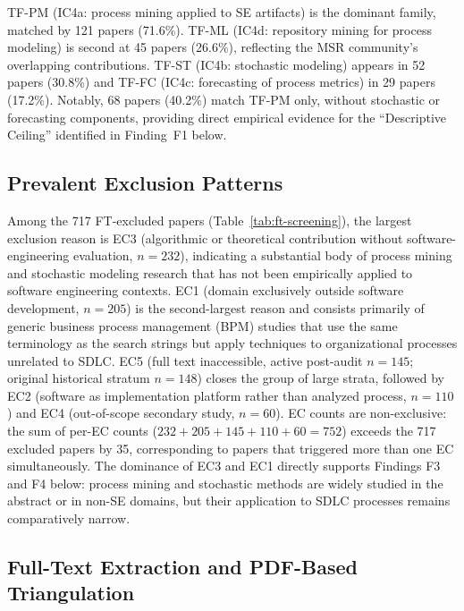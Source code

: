 TF-PM (IC4a: process mining applied to SE artifacts) is the dominant family,
matched by 121 papers (71.6\%). TF-ML (IC4d: repository mining for process modeling)
is second at 45 papers (26.6\%), reflecting the MSR community's overlapping
contributions. TF-ST (IC4b: stochastic modeling) appears in 52 papers (30.8\%) and
TF-FC (IC4c: forecasting of process metrics) in 29 papers (17.2\%). Notably, 68
papers (40.2\%) match TF-PM only, without stochastic or forecasting components,
providing direct empirical evidence for the ``Descriptive Ceiling'' identified
in Finding~F1 below.

\subsection{Prevalent Exclusion Patterns}

Among the 717 FT-excluded papers (Table~\ref{tab:ft-screening}), the largest
exclusion reason is EC3 (algorithmic or theoretical contribution without
software-engineering evaluation, $n=232$), indicating a substantial body of
process mining and stochastic modeling research that has not been empirically
applied to software engineering contexts. EC1 (domain exclusively outside
software development, $n=205$) is the second-largest reason and consists
primarily of generic business process management (BPM) studies that use the
same terminology as the search strings but apply techniques to organizational
processes unrelated to SDLC. EC5 (full text inaccessible, active post-audit
$n=145$; original historical stratum $n=148$) closes the group of large
strata, followed by EC2 (software as implementation platform
rather than analyzed process, $n=110$) and EC4 (out-of-scope secondary study,
$n=60$). EC counts are non-exclusive: the sum of per-EC counts
($232+205+145+110+60 = 752$) exceeds the 717 excluded papers by 35,
corresponding to papers that triggered more than one EC simultaneously. The
dominance of EC3 and EC1 directly supports Findings F3 and F4
below: process mining and stochastic methods are widely studied in the
abstract or in non-SE domains, but their application to SDLC processes
remains comparatively narrow.

\subsection{Full-Text Extraction and PDF-Based Triangulation}
\label{sec:slr-pdf-enrichment}

